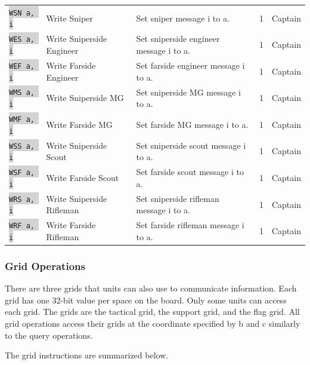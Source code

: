 \documentclass{article}
\newcommand{\vnscode}[1]{\colorbox{lightgray}{\lstinline[language=vns]{#1}}}
\begin{document}
\begin{minipage}{\textwidth}
\begin{tabular}{lllll}
    \vnscode{WSN a, i} & Write Sniper & Set sniper message i to a. & 1 & Captain \\
    \vnscode{WES a, i} & Write Sniperside Engineer & Set sniperside engineer message i to a. & 1 & Captain \\
    \vnscode{WEF a, i} & Write Farside Engineer & Set farside engineer message i to a. & 1 & Captain \\
    \vnscode{WMS a, i} & Write Sniperside MG & Set sniperside MG message i to a. & 1 & Captain \\
    \vnscode{WMF a, i} & Write Farside MG & Set farside MG message i to a. & 1 & Captain \\
    \vnscode{WSS a, i} & Write Sniperside Scout & Set sniperside scout message i to a. & 1 & Captain \\
    \vnscode{WSF a, i} & Write Farside Scout & Set farside scout message i to a. & 1 & Captain \\
    \vnscode{WRS a, i} & Write Sniperside Rifleman & Set sniperside rifleman message i to a. & 1 & Captain \\
    \vnscode{WRF a, i} & Write Farside Rifleman & Set farside rifleman message i to a. & 1 & Captain \\
\end{tabular}
\end{minipage}

\subsubsection{Grid Operations}

There are three grids that units can also use to communicate information. Each
grid has one 32-bit value per space on the board. Only some units can access
each grid. The grids are the tactical grid, the support grid, and the flag grid.
All grid operations access their grids at the coordinate specified by b and c
similarly to the query operations.

The grid instructions are summarized below.
\end{document}
